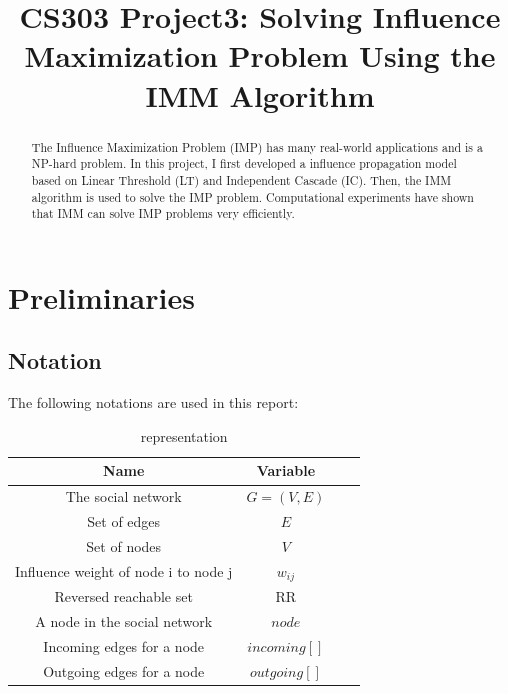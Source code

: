 \documentclass[conference]{IEEEtran}
\begin{document}
  
  \title{CS303 Project3: Solving Influence Maximization Problem Using the IMM Algorithm}
  
  \author{
  }
  
  \maketitle
  
  \begin{abstract}
  The Influence Maximization Problem (IMP) has many real-world applications and is a NP-hard problem. In this project, I first developed a influence propagation model based on Linear Threshold (LT) and Independent Cascade (IC). Then, the IMM algorithm is used to solve the IMP problem. Computational experiments have shown that IMM can solve IMP problems very efficiently.
  \end{abstract}
  \IEEEpeerreviewmaketitle
  
  \section{Preliminaries}
    \subsection{Notation}
    The following notations are used in this report:
    \begin{table}[H]
        \caption{representation}
        \centering
        \begin{tabular}{cccc}
        \toprule
        Name&Variable\\
        \midrule
        The social network&$G=(V,E)$\\
        Set of edges&$E$\\
        Set of nodes&$V$\\
        Influence weight of node i to node j&$w_{ij}$\\
        Reversed reachable set&RR\\
        A node in the social network&$node$\\
        Incoming edges for a node&$incoming[]$\\
        Outgoing edges for a node&$outgoing[]$\\
    
        \bottomrule
        \end{tabular}
        \label{table:1}
        \end{table}
\end{document}

